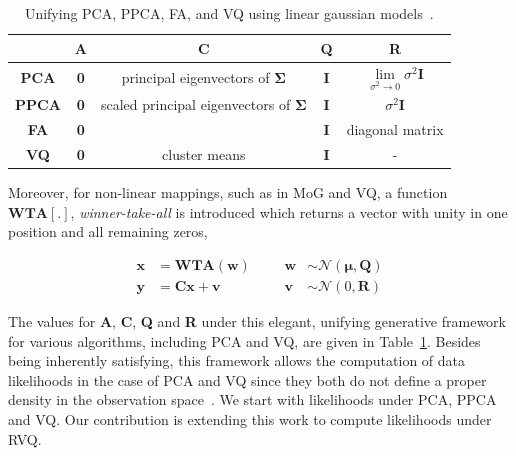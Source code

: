 \begin{table}[t]
\centering
\begin{tabular}{| c | c | c | c | c |}\hline
 				 	&\textbf{A}	 	&	\textbf{C}  									& \textbf{Q} 	&  \textbf{R}                                                                		\\\hline
\textbf{PCA} 	&\textbf{0}		&	principal eigenvectors of $\boldsymbol\Sigma$	& \textbf{I}  	&  $\lim\limits_{\sigma^2 \rightarrow 0} \sigma^2\mathbf{I}$ 	\\\hline
\textbf{PPCA} &\textbf{0}		& 	scaled principal eigenvectors of $\boldsymbol\Sigma$	& \textbf{I}	&										      $\sigma^2 \mathbf{I}$	 \\\hline
\textbf{FA}   	&\textbf{0}		&													& \textbf{I} 	&  diagonal matrix 																\\\hline
\textbf{VQ}	 	&\textbf{0} 	&	cluster means								& \textbf{I}	& 	-																					\\\hline
\end{tabular}
\caption{Unifying PCA, PPCA, FA, and VQ using linear gaussian models~\cite{1999_JNL_Gaussian_roweis, 1999_JNL_PPCA_Tipping}.}
\label{table:LGM_unifying}
\end{table}

Moreover, for non-linear mappings, such as in MoG and VQ, a function $\mathbf{WTA[.]}$, \emph{winner-take-all} is introduced which returns a vector with unity in one position and all remaining zeros,

\begin{equation}
\begin{array}{llllllllllllll}
\mathbf{x} &= \mathbf{WTA}(\mathbf{w}) 						& & & \mathbf{w} &\sim \mathcal{N}(\mathbf{\boldsymbol\mu}, \mathbf{Q})\\
\mathbf{y} &=  \mathbf{C}\mathbf{x} +  \mathbf{v} 		& & & \mathbf{v} & \sim \mathcal{N}(0, \mathbf{R})
\end{array}
\label{LGM2}
\end{equation}

The values for \textbf{A}, \textbf{C}, \textbf{Q} and \textbf{R} under this elegant, unifying generative framework for various algorithms, including PCA and VQ, are given in Table~\ref{table:LGM_unifying}.  Besides being inherently satisfying, this framework allows the computation of data likelihoods in the case of PCA and VQ since they both do not define a proper density in the observation space~\cite{1999_JNL_Gaussian_roweis}.  We start with likelihoods under PCA, PPCA and VQ.  Our contribution is extending this work to compute likelihoods under RVQ.



